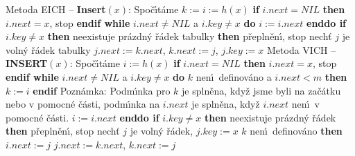\flushpar Metoda EICH -- {\bf Insert$\left(x\right)$}:\newline 
Spo\v c\'\i t\'ame $k:=i:=h\left(x\right)$\newline 
{\bf if} $i.next=NIL$ {\bf then} $i.next=x$, stop {\bf endif\newline 
while} $i.next\ne NIL$ a $i.key\ne x$ {\bf do} $i:=i.next$ {\bf enddo\newline 
if} $i.key\ne x$ {\bf then}\newline 
\phantom{---}{\bf if} neexistuje pr\'azdn\'y \v r\'adek tabulky {\bf then}\newline 
\phantom{------}p\v repln\v en\'\i, stop\newline 
\phantom{---}{\bf else}\newline 
\phantom{------}nech\v t $j$ je voln\'y \v r\'adek tabulky\newline 
\phantom{------}$j.next:=k.next$, $k.next:=j$, $j.key:=x$\newline 
\phantom{---}{\bf endif\newline 
endif
\medskip

}\flushpar Metoda VICH -- {\bf INSERT$\left(x\right)$}:\newline 
Spo\v c\'\i t\'ame $i:=h\left(x\right)$\newline 
{\bf if} $i.next=NIL$ {\bf then} $i.next=x$, stop {\bf endif\newline 
while} $i.next\ne NIL$ a $i.key\ne x$ {\bf do}\newline 
\phantom{---}{\bf if} $k$ nen\'\i\ definov\'ano a $i.next<m$ {\bf then} $
k:=i$ {\bf endif\newline }
Pozn\'amka: Podm\'\i nka pro $k$ je spln\v ena, kdy\v z jsme byli na 
za\v c\'atku nebo v pomocn\'e \v c\'asti, podm\'\i nka na $i.next$ je spln\v ena, 
kdy\v z $i.next$ nen\'\i\ v pomocn\'e \v c\'asti.\newline 
\phantom{---}$i:=i.next$\newline 
{\bf enddo\newline 
if} $i.key\ne x$ {\bf then}\newline 
\phantom{---}{\bf if} neexistuje pr\'azdn\'y \v r\'adek {\bf then}\newline 
\phantom{------}p\v repln\v en\'\i, stop\newline 
\phantom{---}{\bf else}\newline 
\phantom{------}nech\v t $j$ je voln\'y \v r\'adek, $j.key
:=x$\newline 
\phantom{------}{\bf if} $k$ nen\'\i\ definov\'ano {\bf then}\newline 
\phantom{---------}$i.next:=j$\newline 
\phantom{------}{\bf else}\newline 
\phantom{---------}$j.next:=k.next$, $k.next:=j$\newline 
\phantom{------}{\bf endif}\newline 
\phantom{---}{\bf endif\newline 
endif}
\bigskip

